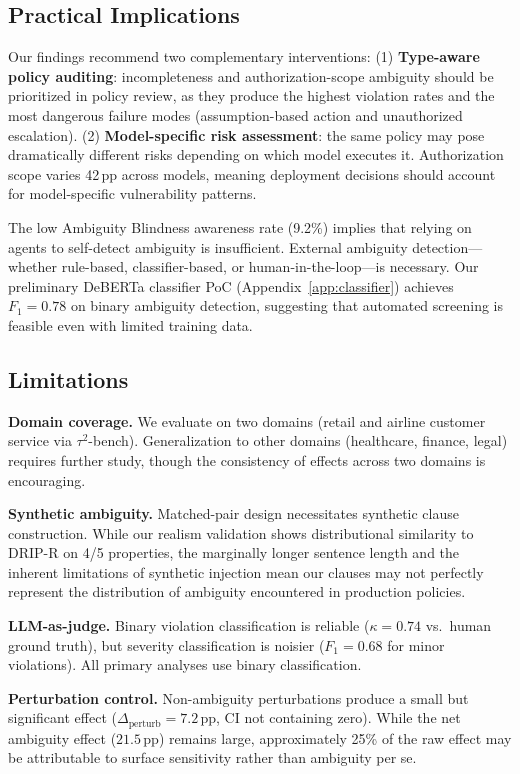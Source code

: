 \documentclass[11pt,twocolumn]{article}
\newcommand{\pp}{\,\text{pp}}
\begin{document}
\subsection{Practical Implications}

Our findings recommend two complementary interventions:
(1) \textbf{Type-aware policy auditing}: incompleteness and authorization-scope ambiguity should be prioritized in policy review, as they produce the highest violation rates and the most dangerous failure modes (assumption-based action and unauthorized escalation).
(2) \textbf{Model-specific risk assessment}: the same policy may pose dramatically different risks depending on which model executes it. Authorization scope varies 42$\pp$ across models, meaning deployment decisions should account for model-specific vulnerability patterns.

The low Ambiguity Blindness awareness rate (9.2\%) implies that relying on agents to self-detect ambiguity is insufficient.
External ambiguity detection---whether rule-based, classifier-based, or human-in-the-loop---is necessary.
Our preliminary DeBERTa classifier PoC (Appendix~\ref{app:classifier}) achieves $F_1=0.78$ on binary ambiguity detection, suggesting that automated screening is feasible even with limited training data.

\subsection{Limitations}

\textbf{Domain coverage.}
We evaluate on two domains (retail and airline customer service via $\tau^2$-bench). Generalization to other domains (healthcare, finance, legal) requires further study, though the consistency of effects across two domains is encouraging.

\textbf{Synthetic ambiguity.}
Matched-pair design necessitates synthetic clause construction. While our realism validation shows distributional similarity to DRIP-R on 4/5 properties, the marginally longer sentence length and the inherent limitations of synthetic injection mean our clauses may not perfectly represent the distribution of ambiguity encountered in production policies.

\textbf{LLM-as-judge.}
Binary violation classification is reliable ($\kappa=0.74$ vs.\ human ground truth), but severity classification is noisier ($F_1=0.68$ for minor violations). All primary analyses use binary classification.

\textbf{Perturbation control.}
Non-ambiguity perturbations produce a small but significant effect ($\Delta_{\text{perturb}}=7.2\pp$, CI not containing zero). While the net ambiguity effect ($21.5\pp$) remains large, approximately 25\% of the raw effect may be attributable to surface sensitivity rather than ambiguity per se.
\end{document}

